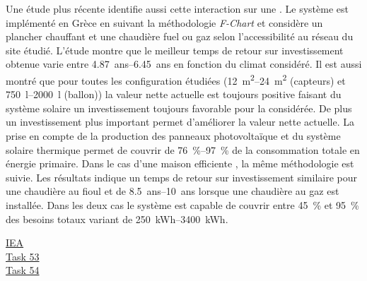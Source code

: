Une étude plus récente \textcite{Tsalikis2015743} identifie aussi cette interaction
sur une . Le système est implémenté en Grèce en suivant
la méthodologie \textit{F-Chart} et considère un plancher chauffant et une chaudière
fuel ou gaz selon l’accessibilité au réseau du site étudié.
L’étude montre que le meilleur temps de retour sur investissement obtenue varie entre
\SIrange{4.87}{6.45}{ans} en fonction du climat considéré. Il est aussi montré que pour toutes les
configuration étudiées (\SIrange{12}{24}{\metre\squared} (capteurs) et \SIrange{750}{2000}{\litre} (ballon))
la valeur nette actuelle est toujours positive faisant du système solaire un investissement toujours favorable
pour la  considérée. De plus un investissement plus important
permet d’améliorer la valeur nette actuelle. La prise en compte de la production
des panneaux photovoltaïque et du système solaire thermique permet de couvrir de
\SIrange{76}{97}{\percent} de la consommation totale en énergie primaire.
Dans le cas d’une maison efficiente \parencite{Martinopoulos2014130}, la même méthodologie
est suivie. Les résultats indique un temps de retour sur investissement similaire pour
une chaudière au fioul et de \SIrange{8.5}{10}{ans} lorsque une chaudière au gaz
est installée.
Dans les deux cas le système est capable de couvrir entre \SI{45}{\percent} et \SI{95}{\percent}
des besoins totaux variant de \SIrange{250}{3400}{kWh}.






\href{http://www.iea-shc.org/tasks-current}{IEA}\\
\href{http://task53.iea-shc.org/publications}{Task 53}\\
\href{http://task54.iea-shc.org/publications}{Task 54}\\





